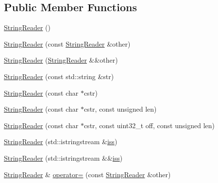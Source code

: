 \subsection*{Public Member Functions}
\begin{DoxyCompactItemize}
\item 
\mbox{\hyperlink{classlucene_1_1core_1_1analysis_1_1StringReader_a58300c89dc23bee57f60fea22572d3da}{String\+Reader}} ()
\item 
\mbox{\hyperlink{classlucene_1_1core_1_1analysis_1_1StringReader_ac531f5f4b388f8a7cfd2ea0c2ef1a55c}{String\+Reader}} (const \mbox{\hyperlink{classlucene_1_1core_1_1analysis_1_1StringReader}{String\+Reader}} \&other)
\item 
\mbox{\hyperlink{classlucene_1_1core_1_1analysis_1_1StringReader_accebdb26d787469d4f32f94c8c29257b}{String\+Reader}} (\mbox{\hyperlink{classlucene_1_1core_1_1analysis_1_1StringReader}{String\+Reader}} \&\&other)
\item 
\mbox{\hyperlink{classlucene_1_1core_1_1analysis_1_1StringReader_a72cb772b6be24d3f3c7055932a30a41d}{String\+Reader}} (const std\+::string \&str)
\item 
\mbox{\hyperlink{classlucene_1_1core_1_1analysis_1_1StringReader_a2c3a2da6f1c5b1affbdee25ffcb235a6}{String\+Reader}} (const char $\ast$cstr)
\item 
\mbox{\hyperlink{classlucene_1_1core_1_1analysis_1_1StringReader_a4c9a31c3c535283012a540e19077d1e5}{String\+Reader}} (const char $\ast$cstr, const unsigned len)
\item 
\mbox{\hyperlink{classlucene_1_1core_1_1analysis_1_1StringReader_a836d26003eca1d1def03daecf3487bfd}{String\+Reader}} (const char $\ast$cstr, const uint32\+\_\+t off, const unsigned len)
\item 
\mbox{\hyperlink{classlucene_1_1core_1_1analysis_1_1StringReader_af30fe6285128fd4b1d2553017be84501}{String\+Reader}} (std\+::istringstream \&\mbox{\hyperlink{classlucene_1_1core_1_1analysis_1_1StringReader_ada023622e5d849d9fe8e9fcb838af328}{iss}})
\item 
\mbox{\hyperlink{classlucene_1_1core_1_1analysis_1_1StringReader_a47afb692b5f416dc38b25df9e46e79fc}{String\+Reader}} (std\+::istringstream \&\&\mbox{\hyperlink{classlucene_1_1core_1_1analysis_1_1StringReader_ada023622e5d849d9fe8e9fcb838af328}{iss}})
\item 
\mbox{\hyperlink{classlucene_1_1core_1_1analysis_1_1StringReader}{String\+Reader}} \& \mbox{\hyperlink{classlucene_1_1core_1_1analysis_1_1StringReader_ae79c2f5548c96bd451ebcb5a4f34ef0c}{operator=}} (const \mbox{\hyperlink{classlucene_1_1core_1_1analysis_1_1StringReader}{String\+Reader}} \&other)

\end{DoxyCompactItemize}
